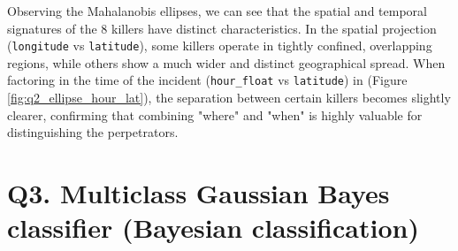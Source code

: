 \documentclass{article}
\begin{document}
Observing the Mahalanobis ellipses, we can see that the spatial and temporal signatures of the 8 killers have distinct characteristics. In the spatial projection (\texttt{longitude} vs \texttt{latitude}), some killers operate in tightly confined, overlapping regions, while others show a much wider and distinct geographical spread. When factoring in the time of the incident (\texttt{hour\_float} vs \texttt{latitude}) in (Figure \ref{fig:q2_ellipse_hour_lat}), the separation between certain killers becomes slightly clearer, confirming that combining "where" and "when" is highly valuable for distinguishing the perpetrators.

\section*{Q3. Multiclass Gaussian Bayes classifier (Bayesian classification)}
\end{document}
